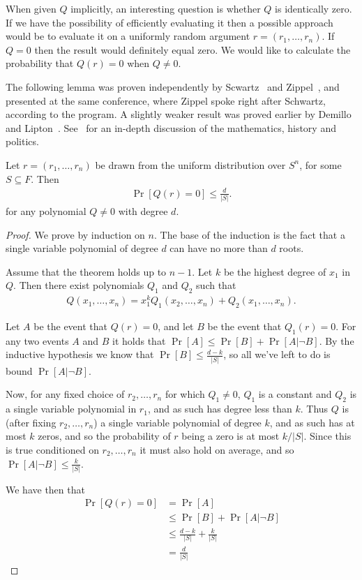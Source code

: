 \documentclass{article}
\begin{document}
When given $Q$ implicitly, an interesting question is whether $Q$ is
identically zero. If we have the possibility of efficiently evaluating
it then a possible approach would be to evaluate it on a uniformly
random argument $r = (r_1, \ldots, r_n)$. If $Q = 0$ then the result
would definitely equal zero. We would like to calculate the
probability that $Q(r) = 0$ when $Q \neq 0$.

The following lemma was proven independently by
Scwartz~\cite{Schwartz:1980} and Zippel~\cite{Zippel:1979}, and
presented at the same conference, where Zippel spoke right after
Schwartz, according to the program. A slightly weaker result was
proved earlier by Demillo and
Lipton~\cite{DemilloLipton:1978}. See~\cite{LiptonBlog} for an
in-depth discussion of the mathematics, history and politics.

\begin{lemma}
  Let $r = (r_1, \ldots, r_n)$ be drawn from the uniform distribution
  over $S^n$, for some $S \subseteq F$. Then
  \begin{align*}
    \Pr[Q(r) = 0] \leq \frac{d}{|S|}.
  \end{align*}
  for any polynomial $Q \neq 0$ with degree $d$.
\end{lemma}
\begin{proof}
  We prove by induction on $n$. The base of the induction is the fact
  that a single variable polynomial of degree $d$ can have no more
  than $d$ roots.

  Assume that the theorem holds up to $n-1$. Let $k$ be the highest
  degree of $x_1$ in $Q$. Then there exist polynomials $Q_1$ and $Q_2$
  such that
  \begin{align*}
    Q(x_1, \ldots, x_n) = x_1^kQ_1(x_2, \ldots, x_n) + Q_2(x_1, \ldots, x_n).
  \end{align*}

  Let $A$ be the event that $Q(r) = 0$, and let $B$ be the event that
  $Q_1(r) = 0$. For any two events $A$ and $B$ it holds that $\Pr[A]
  \leq \Pr[B] + \Pr[A| \neg B]$. By the inductive hypothesis we know
  that $\Pr[B] \leq \frac{d-k}{|S|}$, so all we've left to do is bound
  $\Pr[A | \neg B]$.
  
  Now, for any fixed choice of $r_2, \ldots, r_n$ for which $Q_1 \neq
  0$, $Q_1$ is a constant and $Q_2$ is a single variable polynomial in
  $r_1$, and as such has degree less than $k$. Thus $Q$ is (after
  fixing $r_2, \ldots, r_n$) a single variable polynomial of degree
  $k$, and as such has at most $k$ zeros, and so the probability of
  $r$ being a zero is at most $k/|S|$. Since this is true conditioned on
  $r_2, \ldots, r_n$ it must also hold on average, and so $\Pr[A |
  \neg B] \leq \frac{k}{|S|}$.

  We have then that
  \begin{align*}
    \Pr[Q(r) = 0] &= \Pr[A]
    \\ &\leq \Pr[B] + \Pr[A| \neg B]
    \\ &\leq \frac{d-k}{|S|} + \frac{k}{|S|}
    \\ &= \frac{d}{|S|}
  \end{align*}
\end{proof}
\end{document}
